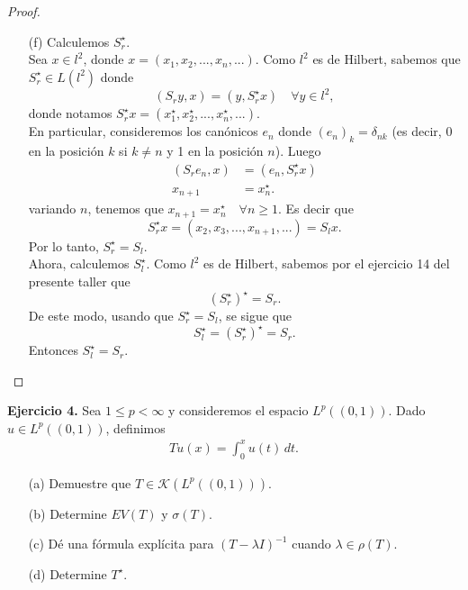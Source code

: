 \begin{proof}
\begin{enumerate}
\item[(f)] Calculemos $S_r^{\star}$. \\
Sea $x\in l^{2}$, donde $x=(x_{1},x_{2},...,x_{n},...)$.
Como $l^2$ es de Hilbert, sabemos que $S_{r}^{\star}\in L(l^{2})$ donde \[(S_{r}y,x)=(y,S_{r}^{\star}x) \quad\forall y\in l^{2},\]
donde notamos $S_{r}^{\star}x=(x_{1}^{\star},x_{2}^{\star},...,x_{n}^{\star},...)$. \\
En particular, consideremos los canónicos $e_{n}$ donde $(e_{n})_{k}=\delta_{nk}$ (es decir, 0 en la posición $k$ si $k\neq n$ y 1 en la posición $n$).
Luego \begin{align*}
(S_{r}e_{n},x)&=(e_{n},S_{r}^{\star}x) \\ x_{n+1}&=x ^{\star}_n.
\end{align*}
variando $n$, tenemos que $x_{n+1}=x_n^{\star} \quad\forall n \geq 1$. Es decir que
\[S^{\star}_rx=(x_2,x_3,...,x_{n+1},...)=S_lx.\]
Por lo tanto, $S^{\star}_r=S_l$. \\

Ahora, calculemos $S_l^{\star}$. Como $l^2$ es de Hilbert, sabemos por el ejercicio 14 del presente taller que \[(S_r^{\star})^{\star} = S_r.\]
De este modo, usando que $S_r^{\star}=S_l$, se sigue que \[S_{l}^{\star}=(S_{r}^{\star})^{\star}=S_r.\] Entonces $S_l^{\star} = S_r$. 

\end{enumerate}
\end{proof}
\textbf{Ejercicio 4.} Sea $1\leq p<\infty$ y consideremos el espacio $L^p((0,1))$. Dado $u \in L^p((0,1))$, definimos
\begin{align*}
    Tu(x)=\int_{0}^xu(t)\, dt.
\end{align*}
\begin{enumerate}
    \item[(a)] Demuestre que $T \in \mathcal{K}(L^p((0,1)))$. 
    \item[(b)] Determine $EV(T)$ y $\sigma(T)$.
    \item[(c)] Dé una fórmula explícita para $(T-\lambda I)^{-1}$ cuando $\lambda\in \rho(T)$.
    \item[(d)] Determine $T^\star$.
\end{enumerate}

